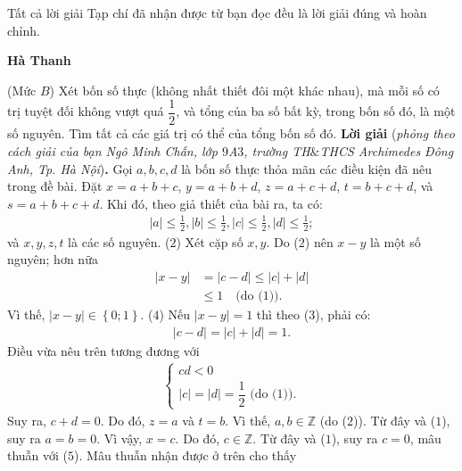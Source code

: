 \begin{multicols}{2}
	\vskip 0.05cm	
	Tất cả lời giải Tạp chí đã nhận được từ bạn đọc đều là lời giải đúng và hoàn chỉnh.
	\begin{flushright}
		\textbf{\color{thachthuctoanhoc}Hà Thanh}
	\end{flushright}
	{}
	(Mức $B$) Xét bốn số thực (không nhất thiết đôi một khác nhau), mà mỗi số có trị tuyệt đối không vượt quá $\dfrac{1}{2}$, và tổng của ba số bất kỳ, trong bốn số đó, là một số nguyên. Tìm tất cả các giá trị có thể của tổng bốn số đó.
	\vskip 0.05cm
	\textbf{\color{thachthuctoanhoc}Lời giải} (\textit{phỏng theo cách giải của bạn Ngô Minh Chấn, lớp $9$A$3$, trường TH$\&$THCS Archimedes Đông Anh, Tp. Hà Nội})\textbf{\color{thachthuctoanhoc}.}
	\vskip 0.05cm
	Gọi $a, b, c, d$ là bốn số thực thỏa mãn các điều kiện đã nêu trong đề bài.
	\vskip 0.05cm
	Đặt $x = a + b + c$, $y = a + b + d$, $z = a + c + d$, $t = b + c + d$, và
	$s = a + b + c + d$.
	\vskip 0.05cm
	Khi đó, theo giả thiết của bài ra, ta có:
	\begin{align*}
		|a| \le \frac{1}{2}, |b| \le \frac{1}{2},|c| \le \frac{1}{2},|d| \le \frac{1}{2}; \tag{$1$}
	\end{align*}
	và $x, y, z, t$ là các số nguyên.        \hfill ($2$)
	\vskip 0.05cm
	Xét cặp số $x, y$.
	Do ($2$) nên $x - y$ là một số nguyên; hơn nữa
	\begin{align*}
		\left| {x - y} \right| &= \left| {c - d} \right| \le |c| + \left| {d} \right| \\
		&\le 1 \quad\text{(do ($1$))}. \tag{$3$}
	\end{align*}
	Vì thế, $\left| {x - y} \right| \in \left\{ {0;1} \right\}.$ \hfill ($4$)
	\vskip 0.05cm
	Nếu $|x - y| = 1$  thì theo ($3$), phải có:
	\begin{align*}
		\left| {c - d} \right| = |c| + \left| {d} \right| = 1.
	\end{align*}
	Điều vừa nêu trên tương đương với
	\begin{align*}
		\begin{cases}
			cd < 0\\
			|c| = |d| = \dfrac{1}{2} \text{ (do ($1$)).}
		\end{cases} \tag{$5$}
	\end{align*}
	Suy ra, $c + d = 0$. Do đó, $z = a$ và $t = b$. Vì thế, $a,b \in \mathbb{Z}$  (do ($2$)). Từ đây và ($1$), suy ra $a = b = 0$.
	\vskip 0.05cm
	Vì vậy, $x = c$. Do đó,  $c \in \mathbb{Z}$. Từ đây và ($1$), suy ra $c = 0$, mâu thuẫn với ($5$).
	\vskip 0.05cm
	Mâu thuẫn nhận được ở trên cho thấy

\end{multicols}
